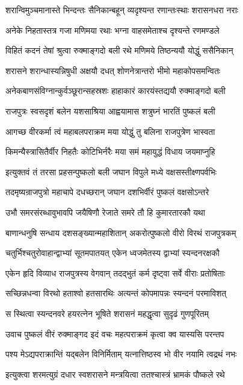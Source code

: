 \twolineshloka
{शरान्विमुञ्चमानास्ते भिन्दन्तः सैनिकान्बहून्}
{व्यदृश्यन्त रणान्तःस्थाः शरासनधरा नराः}%

\twolineshloka
{अनेके निहतास्तत्र गजा मणिमया रथाः}
{भग्ना वाहसमेताश्च दृश्यन्ते रणमण्डले}%

\twolineshloka
{विहितं कदनं तेषां श्रुत्वा रुक्माङ्गदो बली}
{रथे मणिमये तिष्ठन्ययौ योद्धुं ससैनिकान्}%

\twolineshloka
{शरासने शरान्धास्यन्निषुधी अक्षयौ दधत्}
{शोणनेत्रान्तरो भीमो महाकोपसमन्वितः}%

\twolineshloka
{अनेकबाणसंविग्नान्कुर्वञ्छूरान्सहस्रशः}
{हाहाकारं कारयंस्तद्ययौ रुक्माङ्गदो बली}%

\twolineshloka
{राजपुत्रः स्वसदृशं बलेन यशसाश्रिया}
{आह्वयामास शत्रुघ्नं भारतिं पुष्कलं बली}%


\twolineshloka
{आगच्छ वीरकर्मा त्वं महाबलपराक्रम}
{मया योद्धुं तु बलिना राजपुत्रेण भास्वता}%

\twolineshloka
{किमन्यैस्त्रासितैर्वीर निहतैः कोटिभिर्नरैः}
{मया समं महायुद्धं विधाय जयमाप्नुहि}%

\twolineshloka
{इत्युक्तवं तं तरसा प्रहसन्पुष्कलो बली}
{जघान विपुले मध्ये वक्षसस्तीक्ष्णपर्वभिः}%

\twolineshloka
{तदमृष्यन्राजपुत्रो महाचापे दधच्छरान्}
{जघान दशभिर्वीरं पुष्कलं वक्षसोऽन्तरे}%

\twolineshloka
{उभौ समरसंरब्धावुभावपि जयैषिणौ}
{रेजाते समरे तौ हि कुमारतारकौ यथा}%

\twolineshloka
{बाणान्धनुषि सन्धाय दशसङ्ख्यान्महाशितान्}
{अकरोत्पुष्कलो वीरो विरथं राजपुत्रकम्}%

\twolineshloka
{चतुर्भिश्चतुरोवाहान्द्वाभ्यां सूतमपातयत्}
{एकेन ध्वजमेतस्य द्वाभ्यां स्यन्दनरक्षकौ}%

\twolineshloka
{एकेन हृदि विव्याध राजपुत्रस्य वेगवान्}
{तदद्भुतं कर्म दृष्ट्वा सर्वे वीराः प्रतोषिताः}%

\twolineshloka
{सच्छिन्नधन्वा विरथो हताश्वो हतसारथिः}
{अत्यन्तं कोपमापन्नः स्यन्दनं परमाविशत्}%

\twolineshloka
{स स्थित्वा स्यन्दनवरे हयरत्नेन भूषिते}
{शरासनं महद्धृत्वा सुदृढं गुणपूरितम्}%

\twolineshloka
{उवाच पुष्कलं वीरं रुक्माङ्गद इदं वचः}
{महत्पराक्रमं कृत्वा क्व यास्यसि परन्तप}%

\twolineshloka
{पश्य मेऽद्यपराक्रान्तिं यद्बलेन विनिर्मिताम्}
{यत्नात्तिष्ठस्व भो वीर नयामि त्वद्रथं नभः}%

\twolineshloka
{इत्युक्त्वा शरमत्युग्रं दधार स्वशरासने}
{मन्त्रयित्वा ततश्चास्त्रं भ्रामकं पौष्कले रथे}%

